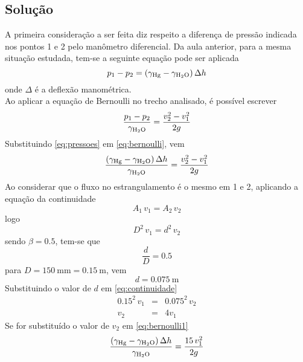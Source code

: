 \documentclass[a4paper, 12pt, brazilian]{article}
\numberwithin{equation}{section}
\begin{document}
	\subsection{Solução}
	A primeira consideração a ser feita diz respeito a diferença de pressão indicada nos pontos 1 e 2 pelo manômetro diferencial. Da aula anterior, para a mesma situação estudada, tem-se a seguinte equação pode ser aplicada
	\begin{equation}
		\label{eq:pressoes}
		p_{1}-p_{2}=(\gamma_{\ce{Hg}}-\gamma_{\ce{H2O}})\,\Delta h
	\end{equation}
	onde $\Delta$ é a deflexão manométrica.\\
	Ao aplicar a equação de Bernoulli no trecho analisado, é possível escrever
	\begin{equation}
		\label{eq:bernoulli}
		\dfrac{p_{1}-p_{2}}{\gamma_{\ce{H2O}}}=\dfrac{v_{2}^{2}-v_{1}^{2}}{2g}
	\end{equation}
	Substituindo \eqref{eq:pressoes} em \eqref{eq:bernoulli}, vem
	\begin{equation}
		\label{eq:bernoulli1}
		\dfrac{(\gamma_{\ce{Hg}}-\gamma_{\ce{H2O}})\,\Delta h}{\gamma_{\ce{H2O}}}=\dfrac{v_{2}^{2}-v_{1}^{2}}{2g}
	\end{equation}
	Ao considerar que o fluxo no estrangulamento é o mesmo em 1 e 2, aplicando a equação da continuidade
	\begin{equation}
		A_{1}\,v_{1}=A_{2}\,v_{2}
	\end{equation}
	logo
	\begin{equation}
	\label{eq:continuidade}
		D^{2}\,v_{1}=d^{2}\,v_{2}
	\end{equation}
	sendo $\beta=0.5$, tem-se que
	\begin{equation}
		\dfrac{d}{D}=0.5
	\end{equation}
	para $D=\SI{150}{\milli\meter}=\SI{0.15}{\meter}$, vem
	\begin{equation}
		d=\SI{0.075}{\meter}
	\end{equation}
	Substituindo o valor de $d$ em \eqref{eq:continuidade}
	\begin{eqnarray}
		0.15^{2}\,v_{1}&=&0.075^{2}\,v_{2}\\
		v_{2}&=&4v_{1}
	\end{eqnarray}
	Se for substituído o valor de $v_{2}$ em \eqref{eq:bernoulli1}
	\begin{equation}
		\label{eq:bernoulli1}
		\dfrac{(\gamma_{\ce{Hg}}-\gamma_{\ce{H2O}})\,\Delta h}{\gamma_{\ce{H2O}}}=\dfrac{15\,v_{1}^{2}}{2g}
	\end{equation}
\end{document}
